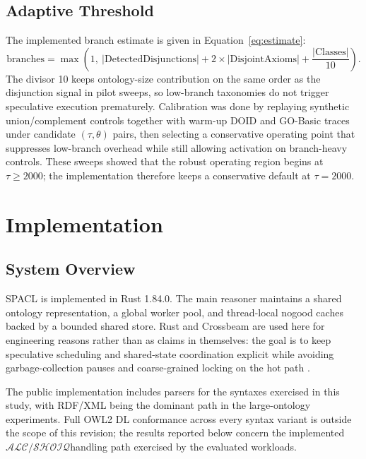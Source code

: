 \documentclass[preprint,12pt,times]{elsarticle}
\newcommand{\dlfrag}{\ensuremath{\mathcal{ALC/SHOIQ}}}
\begin{document}
\subsection{Adaptive Threshold}
\label{sec:adaptive}

The implemented branch estimate is given in Equation~\ref{eq:estimate}:
\begin{equation}
\text{branches} = \max\left(1, \ |\text{DetectedDisjunctions}| + 2 \times |\text{DisjointAxioms}| + \frac{|\text{Classes}|}{10}\right).
\label{eq:estimate}
\end{equation}
The divisor 10 keeps ontology-size contribution on the same order as the disjunction signal in pilot sweeps, so low-branch taxonomies do not trigger speculative execution prematurely. Calibration was done by replaying synthetic union/complement controls together with warm-up DOID and GO-Basic traces under candidate $(\tau,\theta)$ pairs, then selecting a conservative operating point that suppresses low-branch overhead while still allowing activation on branch-heavy controls. These sweeps showed that the robust operating region begins at $\tau \ge 2000$; the implementation therefore keeps a conservative default at $\tau = 2000$.

\section{Implementation}
\label{sec:implementation}

\subsection{System Overview}
\label{sec:rust}

SPACL is implemented in Rust 1.84.0. The main reasoner maintains a shared ontology representation, a global worker pool, and thread-local nogood caches backed by a bounded shared store. Rust and Crossbeam are used here for engineering reasons rather than as claims in themselves: the goal is to keep speculative scheduling and shared-state coordination explicit while avoiding garbage-collection pauses and coarse-grained locking on the hot path \cite{crossbeam}.

The public implementation includes parsers for the syntaxes exercised in this study, with RDF/XML being the dominant path in the large-ontology experiments. Full OWL2 DL conformance across every syntax variant is outside the scope of this revision; the results reported below concern the implemented \dlfrag handling path exercised by the evaluated workloads.
\end{document}
